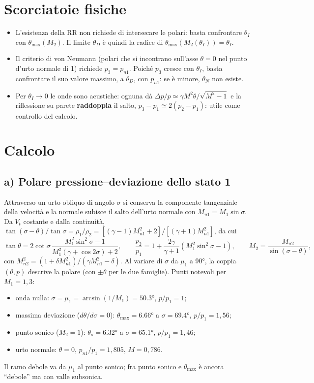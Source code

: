 \documentclass[11pt,a4paper]{article}
\begin{document}
\section{Scorciatoie fisiche}
\begin{itemize}
\item L'esistenza della RR non richiede di intersecare le polari: basta confrontare $\theta_I$ con
  $\theta_{\max}(M_2)$. Il limite $\theta_D$ è quindi la radice di $\theta_{\max}(M_2(\theta_I))=\theta_I$.
\item Il criterio di von Neumann (polari che si incontrano sull'asse $\theta=0$ nel punto d'urto normale di 1)
  richiede $p_3=p_{n1}$. Poiché $p_3$ cresce con $\theta_I$, basta confrontare il suo valore massimo, a $\theta_D$, con
  $p_{n1}$: se è minore, $\theta_N$ non esiste.
\item Per $\theta_I\to0$ le onde sono acustiche: ognuna dà $\Delta p/p\simeq\gamma M^2\theta/\sqrt{M^2-1}$ e la
  riflessione su parete \textbf{raddoppia} il salto, $p_3-p_1\simeq2(p_2-p_1)$: utile come controllo del calcolo.
\end{itemize}

\section{Calcolo}

\subsection*{a) Polare pressione--deviazione dello stato 1}
Attraverso un urto obliquo di angolo $\sigma$ si conserva la componente tangenziale della velocità e la normale
subisce il salto dell'urto normale con $M_{n1}=M_1\sin\sigma$. Da $V_t$ costante e dalla continuità,
$\tan(\sigma-\theta)/\tan\sigma=\rho_1/\rho_2=[(\gamma-1)M_{n1}^2+2]/[(\gamma+1)M_{n1}^2]$, da cui
\[
\tan\theta=2\cot\sigma\,\frac{M_1^2\sin^2\sigma-1}{M_1^2(\gamma+\cos2\sigma)+2},\qquad
\frac{p_2}{p_1}=1+\frac{2\gamma}{\gamma+1}\left(M_1^2\sin^2\sigma-1\right),\qquad
M_2=\frac{M_{n2}}{\sin(\sigma-\theta)} ,
\]
con $M_{n2}^2=(1+\delta M_{n1}^2)/(\gamma M_{n1}^2-\delta)$. Al variare di $\sigma$ da $\mu_1$ a \ang{90}, la coppia
$(\theta,p)$ descrive la polare (con $\pm\theta$ per le due famiglie). Punti notevoli per $M_1=1{,}3$:
\begin{itemize}
\item onda nulla: $\sigma=\mu_1=\arcsin(1/M_1)=\ang{50.3}$, $p/p_1=1$;
\item massima deviazione ($d\theta/d\sigma=0$): $\theta_{\max}=\ang{6.66}$ a $\sigma=\ang{69.4}$, $p/p_1=1{,}56$;
\item punto sonico ($M_2=1$): $\theta_s=\ang{6.32}$ a $\sigma=\ang{65.1}$, $p/p_1=1{,}46$;
\item urto normale: $\theta=0$, $p_{n1}/p_1=1{,}805$, $M=0{,}786$.
\end{itemize}
Il ramo debole va da $\mu_1$ al punto sonico; fra punto sonico e $\theta_{\max}$ è ancora ``debole'' ma con valle
subsonica.
\end{document}
